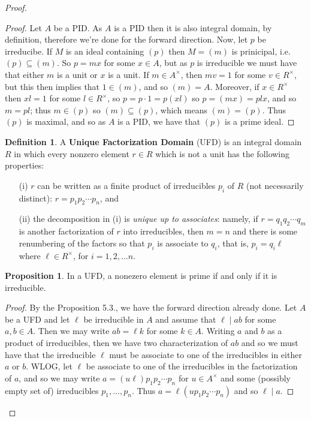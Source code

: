 \documentclass[9pt,reqno]{amsart}
\theoremstyle{definition}
\newtheorem{defi}{Definition}[section]
\newtheorem{prop}{Proposition}[section]
\begin{document}
\begin{proof}
\begin{proof}
	Let $A$ be a PID. As $A$ is a PID then it is also integral domain, by definition, therefore we're done for the forward direction. Now, let $p$ be irreducibe. If $M$ is an ideal containing $(p)$ then $M = (m)$ is prinicipal, i.e. $(p) \subseteq (m)$. So $p = mx$ for some $x \in A$, but as $p$ is irreducible we must have that either $m$ is a unit or $x$ is a unit. If $m \in A^\times$, then $mv = 1$ for some $v \in R^\times$, but this then implies that $1 \in (m)$, and so $(m) = A$. Moreover, if $x \in R^\times$ then $xl = 1$ for some $l \in R^\times$, so $p = p \cdot 1 = p (xl) $ so $p = (mx) = pl x $, and so $ m = pl  $; thus $m \in (p)$ so $(m) \subseteq (p)$, which means $(m) = (p)$. Thus $(p)$ is maximal, and so as $A$ is a PID, we have that $(p)$ is a prime ideal.
\end{proof}

\begin{defi}
A \textbf{Unique Factorization Domain} (UFD) is an integral domain $R$ in which every nonzero element $r \in R$ which is not a unit has the following properties: 
\begin{itemize}
	\item[(i)] $r$ can be written as a finite product of irreducibles $p_i$ of $R$ (not necessarily distinct): $r = p_1 p_2 \cdots p_n$, and 
	\item[(ii)] the decomposition in (i) is \textit{unique up to associates}: namely, if $r = q_1 q_2 \cdots q_m$ is another factorization of $r$ into irreducibles, then $m = n$ and there is some renumbering of the factors so that $p_i$ is associate to $q_i$, that is, $p_i = q_i \ell$ where $\ell \in R^\times$, for $i = 1,2, \ldots n$. 
\end{itemize}	
\end{defi}

\begin{prop}
	In a UFD, a nonezero element is prime if and only if it is irreducible. 
\end{prop}
\begin{proof}
	By the Proposition 5.3., we have the forward direction already done. Let $A$ be a UFD and let $\ell $ be irreducible in $A$ and assume that $\ell \mid ab$ for some $a, b \in A$. Then we may write $ab = \ell k$ for some $k \in A$. Writing $a$ and $b$ as a product of irreducibles, then we have two characterization of $ab$ and so we must have that the irreducible $\ell$ must be associate to one of the irreducibles in either $a$ or $b$. WLOG, let $\ell$ be associate to one of the irreducibles in the factorization of $a$, and so we may write $a = (u \ell) p_1 p_2 \cdots p_n$ for $u \in A^\times$ and some (possibly empty set of) irreducibles $p_1, \ldots, p_n$. Thus $a = \ell (u p_1 p_2 \cdots p_n)$ and so $\ell \mid a$.  
\end{proof}



\end{proof}
\end{document}
